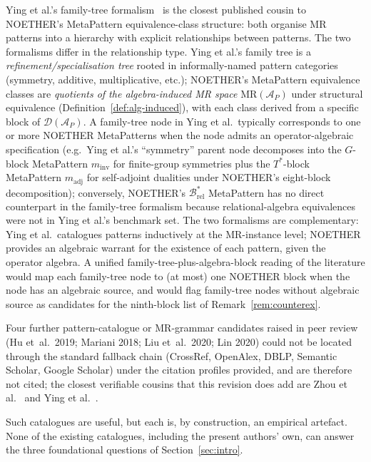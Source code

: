 \documentclass[acmsmall, screen]{acmart}
\begin{document}
Ying et al.'s family-tree formalism~\cite{Ying2025MRPatterns} is the closest published cousin to NOETHER's MetaPattern equivalence-class structure: both organise MR patterns into a hierarchy with explicit relationships between patterns. The two formalisms differ in the relationship type. Ying et al.'s family tree is a \emph{refinement/specialisation tree} rooted in informally-named pattern categories (symmetry, additive, multiplicative, etc.); NOETHER's MetaPattern equivalence classes are \emph{quotients of the algebra-induced MR space} $\mathrm{MR}(\mathcal{A}_P)$ under structural equivalence (Definition~\ref{def:alg-induced}), with each class derived from a specific block of $\mathcal{D}(\mathcal{A}_P)$. A family-tree node in Ying et al.\ typically corresponds to one or more NOETHER MetaPatterns when the node admits an operator-algebraic specification (e.g.\ Ying et al.'s ``symmetry'' parent node decomposes into the $G$-block MetaPattern $m_{\mathrm{inv}}$ for finite-group symmetries plus the $T^{*}$-block MetaPattern $m_{\mathrm{adj}}$ for self-adjoint dualities under NOETHER's eight-block decomposition); conversely, NOETHER's $\mathcal{B}^{*}_{\mathrm{rel}}$ MetaPattern has no direct counterpart in the family-tree formalism because relational-algebra equivalences were not in Ying et al.'s benchmark set. The two formalisms are complementary: Ying et al.\ catalogues patterns inductively at the MR-instance level; NOETHER provides an algebraic warrant for the existence of each pattern, given the operator algebra. A unified family-tree-plus-algebra-block reading of the literature would map each family-tree node to (at most) one NOETHER block when the node has an algebraic source, and would flag family-tree nodes without algebraic source as candidates for the ninth-block list of Remark~\ref{rem:counterex}.

Four further pattern-catalogue or MR-grammar candidates raised in peer review (Hu et~al.\ 2019; Mariani 2018; Liu et~al.\ 2020; Lin 2020) could not be located through the standard fallback chain (CrossRef, OpenAlex, DBLP, Semantic Scholar, Google Scholar) under the citation profiles provided, and are therefore not cited; the closest verifiable cousins that this revision does add are Zhou et al.~\cite{Zhou2020SymmetryMRP} and Ying et al.~\cite{Ying2025MRPatterns}.

Such catalogues are useful, but each is, by construction, an empirical artefact. None of the existing catalogues, including the present authors' own, can answer the three foundational questions of Section~\ref{sec:intro}.
\end{document}

